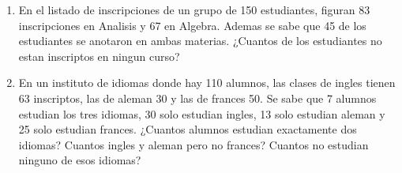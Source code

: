 \begin{enunciado}{\ejercicio}
    \begin{enumerate}[label=\alph*)]
        \item  En el listado de inscripciones de un grupo de 150 estudiantes,
        figuran 83 inscripciones en Analisis y 67 en Algebra. Ademas se
        sabe que 45 de los estudiantes se anotaron en ambas materias.
        ¿Cuantos de los estudiantes no estan inscriptos en ningun curso?
        \item  En un instituto de idiomas donde hay 110 alumnos, las clases
        de ingles tienen 63 inscriptos, las de aleman 30 y las de frances
        50. Se sabe que 7 alumnos estudian los tres idiomas, 30 solo
        estudian ingles, 13 solo estudian aleman y 25 solo estudian frances.
        ¿Cuantos alumnos estudian exactamente dos idiomas? Cuantos
        ingles y aleman pero no frances? Cuantos no estudian ninguno
        de esos idiomas?
      \end{enumerate}
\end{enunciado}

